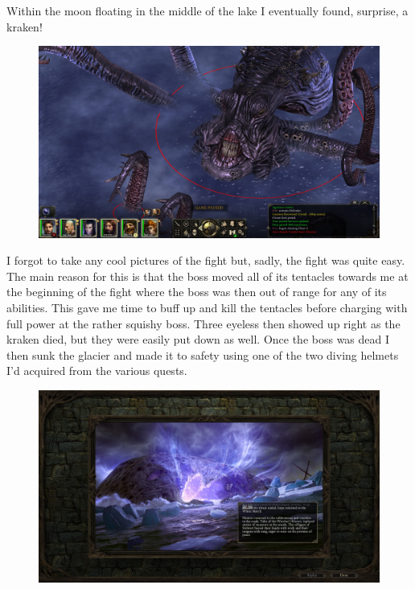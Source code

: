 \documentclass{article}
\begin{document}
Within the moon floating in the middle of the lake I eventually found, surprise, a kraken!

\begin{figure}
\includegraphics[scale=0.33]{files/blog/2020_01_18_poe_potd_wmpt2/2020_01_18_cayron2.jpg}
\end{figure}

I forgot to take any cool pictures of the fight but, sadly, the fight was quite easy.  The main reason for this is that the boss moved all of its tentacles towards me at the beginning of the fight where the boss was then out of range for any of its abilities.  This gave me time to buff up and kill the tentacles before charging with full power at the rather squishy boss.  Three eyeless then showed up right as the kraken died, but they were easily put down as well.  Once the boss was dead I then sunk the glacier and made it to safety using one of the two diving helmets I'd acquired from the various quests.

\begin{figure}
\includegraphics[scale=0.33]{files/blog/2020_01_18_poe_potd_wmpt2/2020_01_18_cayron3.jpg}
\end{figure}
\end{document}
